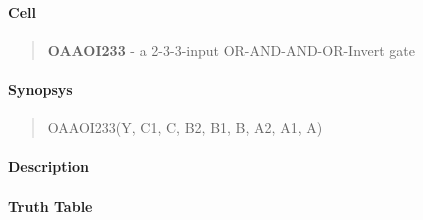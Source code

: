 \label{OAAOI233}
\paragraph{Cell}
\begin{quote}
    \textbf{OAAOI233} - a 2-3-3-input OR-AND-AND-OR-Invert gate
\end{quote}

\paragraph{Synopsys}
\begin{quote}
    OAAOI233(Y, C1, C, B2, B1, B, A2, A1, A)
\end{quote}

\paragraph{Description}

%

\paragraph{Truth Table}
%

